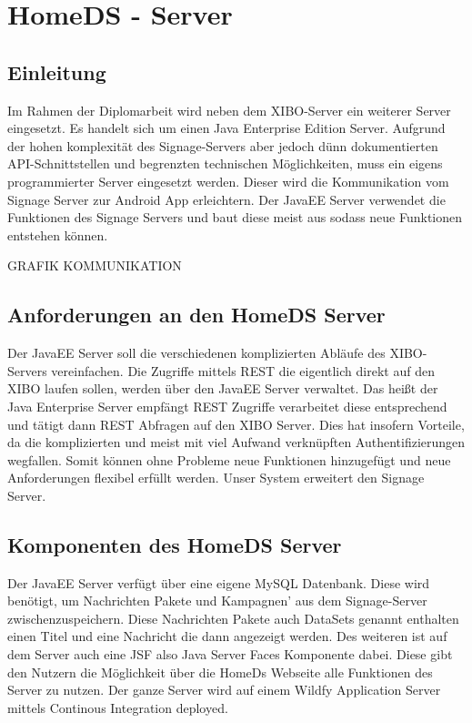 \chapter{HomeDS - Server}
\section{Einleitung}\label{sec:einleitung}
Im Rahmen der Diplomarbeit wird neben dem XIBO-Server ein weiterer Server eingesetzt. Es handelt sich um einen Java Enterprise Edition Server. Aufgrund der hohen komplexität des Signage-Servers aber jedoch dünn dokumentierten API-Schnittstellen und begrenzten technischen Möglichkeiten, muss ein eigens programmierter Server eingesetzt werden. Dieser wird die Kommunikation vom Signage Server zur Android App erleichtern. Der JavaEE Server verwendet die Funktionen des Signage Servers und baut diese meist aus sodass neue Funktionen entstehen können.

GRAFIK KOMMUNIKATION
 
\section{Anforderungen an den HomeDS Server}\label{sec:homeds}
Der JavaEE Server soll die verschiedenen komplizierten Abläufe des XIBO-Servers vereinfachen. Die  Zugriffe mittels REST die eigentlich direkt auf den XIBO laufen sollen, werden über den JavaEE Server verwaltet. Das heißt der Java Enterprise Server empfängt REST Zugriffe verarbeitet diese entsprechend und tätigt dann REST Abfragen auf den XIBO Server. Dies hat insofern Vorteile, da die komplizierten und meist mit viel Aufwand verknüpften Authentifizierungen wegfallen. Somit können ohne Probleme neue Funktionen hinzugefügt und neue Anforderungen flexibel erfüllt werden. Unser System erweitert  den Signage Server.
 
\section{Komponenten des HomeDS Server}\label{sec:homedscomponents}
Der JavaEE Server verfügt über eine eigene MySQL Datenbank. Diese wird benötigt, um Nachrichten Pakete und Kampagnen' aus dem Signage-Server zwischenzuspeichern. Diese Nachrichten Pakete auch DataSets genannt enthalten einen Titel und eine Nachricht die dann angezeigt werden. Des weiteren ist auf dem Server auch eine JSF also Java Server Faces Komponente dabei. Diese gibt den Nutzern die Möglichkeit über die HomeDs Webseite alle Funktionen des Server zu nutzen. Der ganze Server wird auf einem Wildfy Application Server mittels Continous Integration deployed. 
 

